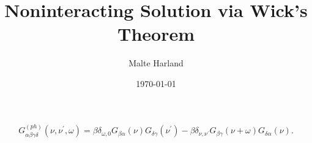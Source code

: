 \documentclass[12pt]{article}
\title{Noninteracting Solution via Wick's Theorem}
\date{\today}
\author{Malte Harland}
\begin{document}
\maketitle
\begin{equation}
  G^{(ph)}_{\alpha\beta\gamma\delta}(\nu,\nu^\prime,\omega) = \beta \delta_{\omega,0} G_{\beta \alpha}(\nu) G_{\delta \gamma}(\nu^\prime) - \beta \delta_{\nu,\nu^\prime} G_{\beta \gamma}(\nu + \omega) G_{\delta \alpha}(\nu).
\end{equation}
\end{document}
